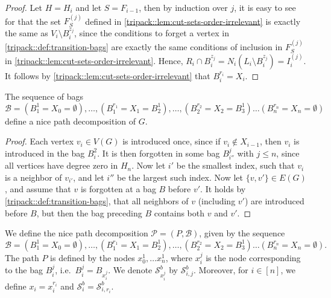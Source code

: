 \documentclass[a4paper,UKenglish,cleveref, autoref, thm-restate]{lipics-v2021}
\begin{document}
\begin{proof}
    Let $H = H_i$ and let $S =F_{i-1}$, then by induction over $j$, it is easy to see for that the set $F^{(j)}_S$ defined in \cref{tripack::lem:cut-sets-order-irrelevant} is exactly the same as $V_i\setminus B_i^{z_j}$, since the conditions to forget a vertex in \cref{tripack::def:transition-bags} are exactly the same conditions of inclusion in $F^{(j)}_S$ in \cref{tripack::lem:cut-sets-order-irrelevant}. Hence, $R_i\cap B_i^{z_j} = N_i(L_i\setminus B_i^{z_j}) = I_i^{(j)}$. It follows by \cref{tripack::lem:cut-sets-order-irrelevant} that $B_i^{r_i} = X_{i}$.
\end{proof}

\begin{lemma}
    The sequence of bags
    \[\mathcal{B} = (B_1^1 = X_0 = \emptyset), \dots, (B_1^{r_1} = X_1 = B_2^1), \dots, (B_2^{r_2}= X_2 = B_3^1) \dots (B_{n}^{r_{n}} = X_n = \emptyset)\]
    define a nice path decomposition of $G$.
\end{lemma}

\begin{proof}
    Each vertex $v_i \in V(G)$ is introduced once, since if $v_i\notin X_{i-1}$, then $v_i$ is introduced in the bag $B_i^2$. It is then forgotten in some bag $B_{i''}^j$ with $j\leq n$, since all vertices have degree zero in $H_n$. Now let $i'$ be the smallest index, such that $v_i$ is a neighbor of $v_{i'}$, and let $i''$ be the largest such index. Now let $\{v, v'\}\in E(G)$, and assume that $v$ is forgotten at a bag $B$ before $v'$. It holds by \cref{tripack::def:transition-bags}, that all neighbors of $v$ (including $v'$) are introduced before $B$, but then the bag preceding $B$ contains both $v$ and $v'$.
\end{proof}

\begin{definition}\label{tripack::def:arrangement-to-path-decomposition}
    We define the nice path decomposition $\mathcal{P} = (P, \mathcal{B})$, given by the sequence
    \[\mathcal{B} = (B_1^1 = X_0 = \emptyset), \dots, (B_1^{r_1} = X_1 = B_2^1), \dots, (B_2^{r_2}= X_2 = B_3^1) \dots (B_{n}^{r_{n}} = X_n = \emptyset).\]
    The path $P$ is defined by the nodes $x_0^1,\dots x_n^1$, where $x_i^j$ is the node corresponding to the bag $B_i^j$, i.e.\ $B_i^j = B_{x_i^j}$. We denote $\mathcal{S}_{x_i^j}^b$ by $\mathcal{S}_{i,j}^b$. Moreover, for $i\in[n]$, we define $x_i = x_i^{r_i}$ and $\mathcal{S}_i^b = \mathcal{S}_{i,r_i}^b$.
\end{definition}
\end{document}
